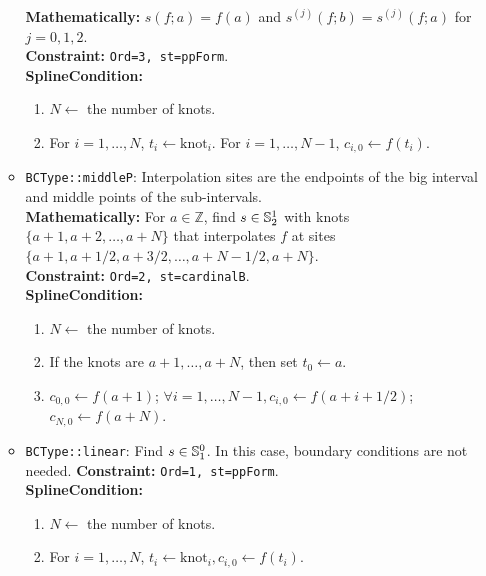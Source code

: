 \documentclass[12pt]{article}
\begin{document}
\begin{itemize}
\begin{itemize}
                        \textbf{Mathematically:} \(s(f; a)=f(a)\) and \(s^{(j)}(f; b)=s^{(j)}(f; a)\) for \(j=0,1,2\). \\
                        \textbf{Constraint:} \texttt{Ord=3, st=ppForm}. \\
                        \textbf{SplineCondition:}
                        \begin{enumerate}
                            \item \(N\leftarrow\) the number of knots.
                            \item For \(i=1,\dots,N\), \(t_i\leftarrow \text{knot}_i\). For \(i=1,\dots,N-1\), \(c_{i,0}\leftarrow f(t_i)\).
                        \end{enumerate}
                  \item \texttt{BCType::middleP}: Interpolation sites are the endpoints of the big interval and middle points
                        of the sub-intervals. \\
                        \textbf{Mathematically:} For \(a\in \mathbb Z\), find \(s\in \S_2^1\) with knots \(\{a+1,a+2,\dots,a+N\}\) that interpolates
                        \(f\) at sites \(\{a+1,a+1/2,a+3/2,\dots, a+N-1/2,a+N\}\). \\
                        \textbf{Constraint:} \texttt{Ord=2, st=cardinalB}. \\
                        \textbf{SplineCondition:}
                        \begin{enumerate}
                            \item \(N\leftarrow\) the number of knots.
                            \item If the knots are \(a+1,\dots, a+N\), then set \(t_0\leftarrow a\).
                            \item \(c_{0,0}\leftarrow f(a+1)\); \(\forall i=1,\dots,N-1,c_{i,0}\leftarrow f(a+i+1/2)\); \(c_{N,0}\leftarrow f(a+N)\).
                        \end{enumerate}
                  \item \texttt{BCType::linear}: Find \(s\in \S_1^0\). In this case, boundary conditions are not needed.
                        \textbf{Constraint:} \texttt{Ord=1, st=ppForm}. \\
                        \textbf{SplineCondition:}
                        \begin{enumerate}
                            \item \(N\leftarrow\) the number of knots.
                            \item For \(i=1,\dots,N\), \(t_i\leftarrow \text{knot}_i, c_{i,0}\leftarrow f(t_i)\).
                        \end{enumerate}
              \end{itemize}
    \end{itemize}
\end{document}

